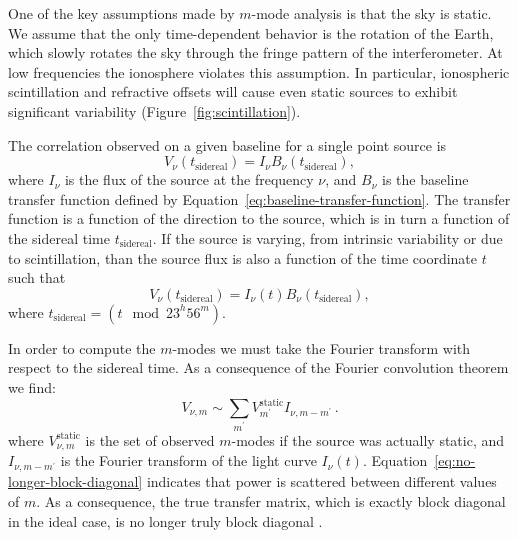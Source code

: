 \documentclass[twocolumn]{aastex61}
\begin{document}
One of the key assumptions made by $m$-mode analysis is that the sky is static.  We assume that the
only time-dependent behavior is the rotation of the Earth, which slowly rotates the sky through the
fringe pattern of the interferometer. At low frequencies the ionosphere violates this assumption.
In particular, ionospheric scintillation and refractive offsets will cause even static sources to
exhibit significant variability (Figure~\ref{fig:scintillation}).

The correlation observed on a given baseline for a single point source is
\begin{equation}
    V_\nu(t_{\textrm{sidereal}}) = I_\nu B_\nu(t_{\textrm{sidereal}}),
\end{equation}
where $I_\nu$ is the flux of the source at the frequency $\nu$, and $B_\nu$ is the baseline transfer
function defined by Equation~\ref{eq:baseline-transfer-function}. The transfer function is a
function of the direction to the source, which is in turn a function of the sidereal time
$t_{\textrm{sidereal}}$. If the source is varying, from intrinsic variability or due to
scintillation, than the source flux is also a function of the time coordinate $t$ such that
\begin{equation}
    V_\nu(t_{\textrm{sidereal}}) = I_\nu(t) B_\nu(t_{\textrm{sidereal}}),
\end{equation}
where $t_{\textrm{sidereal}} = (t \mod 23^h56^m)$.

In order to compute the $m$-modes we must take the Fourier transform with respect to the sidereal
time. As a consequence of the Fourier convolution theorem we find:
\begin{equation}\label{eq:no-longer-block-diagonal}
    V_{\nu, m} \sim \sum_{m^\prime} V_{m^\prime}^\textrm{static} I_{\nu, m-m^\prime}\,.
\end{equation}
where $V_{\nu, m}^{\textrm{static}}$ is the set of observed $m$-modes if the source was actually
static, and $I_{\nu, m-m^\prime}$ is the Fourier transform of the light curve $I_{\nu}(t)$.
Equation~\ref{eq:no-longer-block-diagonal} indicates that power is scattered between different
values of $m$. As a consequence, the true transfer matrix, which is exactly block diagonal in the
ideal case, is no longer truly block diagonal \citep{richard_ionosphere_thoughts}.
\end{document}
